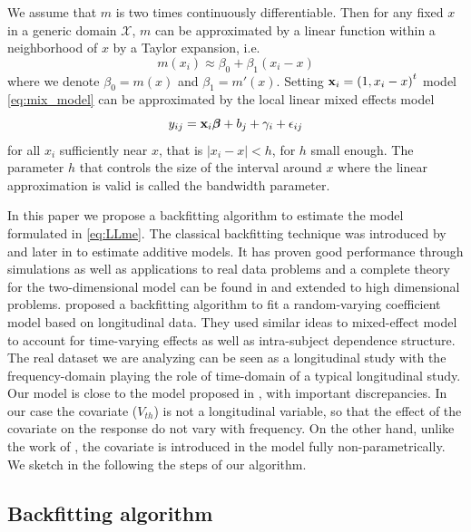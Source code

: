 \documentclass[sn-mathphys]{sn-jnl}%
\def\bbeta{{\boldsymbol{\beta}}}
\theoremstyle{thmstyleone}%
\theoremstyle{thmstyletwo}%
\theoremstyle{thmstylethree}%
\begin{document}
We assume that $m$ is two times continuously differentiable. Then for any fixed $x$ in a generic domain $\mathcal{X}$, $m$ can be approximated by a linear function within a neighborhood of $x$ by a Taylor expansion, i.e.
$$m(x_i)\approx \beta_0 +\beta_1(x_i-x)$$
where we denote $\beta_0=m(x)$ and $\beta_1=m'(x)$. Setting ${\bf x}_i=\left(1,x_i-x\right)^t$ model \eqref{eq:mix_model} can be approximated by the local linear mixed effects model
\begin{equation}\label{eq:LLme}
y_{ij} = {\bf x}_i \bbeta + b_j+ \gamma_i + \epsilon_{ij}
\end{equation}
for all $x_i$ sufficiently near $x$, that is $\lvert  x_i-x \lvert  <h$, for $h$ small enough. The parameter $h$ that controls the size of the interval around $x$  where the linear approximation is valid is called the bandwidth parameter. 


In this paper we propose a backfitting algorithm to estimate the model formulated in \eqref{eq:LLme}. 
The classical backfitting technique was introduced by \cite{BHT1989} and later in \cite{HT1990} to estimate additive models. It has proven good performance through simulations as well as applications to real data problems and a complete theory  for the two-dimensional model can be found in \cite{OR1997} and \cite{Opsomer2000} extended to high dimensional problems. \cite{WL2004} proposed  a backfitting algorithm to fit a random-varying coefficient model based on longitudinal data. They used similar ideas to mixed-effect model to account for time-varying effects as well as intra-subject dependence structure. The real dataset we are analyzing can be seen as a longitudinal study with the frequency-domain playing the role of time-domain of a typical longitudinal study.  Our model is close to the model proposed in \cite{WL2004}, with important discrepancies. In our case the covariate ($V_{th}$) is not a longitudinal variable, so that  the effect of the covariate on the response do not vary with frequency. On the other hand, unlike the work of \cite{WL2004}, the covariate is introduced in the model fully non-parametrically. We sketch in the following the steps of our algorithm.


\subsection{Backfitting algorithm}\label{sec:backfit}
\end{document}
